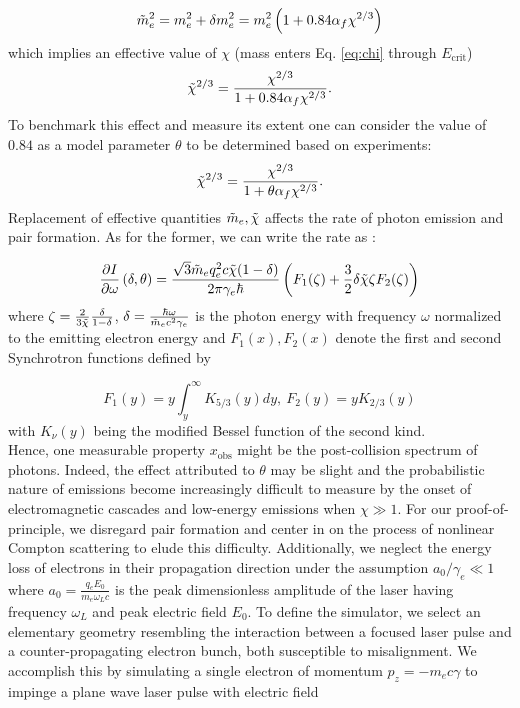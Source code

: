 \documentclass[%
 reprint,
 amsmath,amssymb,
 aps,
]{revtex4-2}
\begin{document}
\begin{equation} \label{eq:EffMass}
\Tilde{m}^2_e = m^2_e + \delta m^2_e = m^2_e \left(1 + 0.84 \alpha_f \chi^{2/3}\right)
\end{equation}
which implies an effective value of $\chi$ (mass enters Eq. \eqref{eq:chi} through $E_{\text{crit}}$)
\begin{equation}
\Tilde{\chi}^{2/3} = \frac{\chi^{2/3}}{1 + 0.84 \alpha_f \chi^{2/3}} .
\end{equation}
To benchmark this effect and measure its extent one can consider the value of $0.84$ as a model parameter $\theta$ to be determined based on experiments:
\begin{equation} \label{eq:EffChi}
\Tilde{\chi}^{2/3} = \frac{\chi^{2/3}}{1 + \theta \alpha_f \chi^{2/3}} .
\end{equation}
Replacement of effective quantities $\Tilde{m}_e, \Tilde{\chi}$ affects the rate of photon emission and pair formation. As for the former, we can write the rate as \cite{berestetskii1982quantum,baier1967quantum}:

\begin{equation} \label{eq:nonLinComptonRate}
\frac{\partial I}{\partial \omega} \left(\delta, \theta \right) = \frac{\sqrt{3} \Tilde{m}_e q_e^2 c \Tilde{\chi}(1-\delta)}{2 \pi \gamma_e \hbar} \left( F_1(\zeta) + \frac{3}{2} \delta \Tilde{\chi} \zeta F_2(\zeta) \right)
\end{equation}
where $\zeta = \frac{2}{3 \Tilde{\chi}} \frac{\delta}{1 - \delta}$, $\delta = \frac{\hbar \omega}{\Tilde{m}_e c^2 \gamma_e}$ is the photon energy with frequency $\omega$ normalized to the emitting electron energy and $F_{1}(x), F_2(x)$ denote the first and second Synchrotron functions defined by

\begin{equation} \label{eq:SynchrotronFunctions}
    F_1(y) = y \int_y^{\infty} K_{5/3}(y) dy, \ F_2(y) = y K_{2/3}(y)
\end{equation}
with $K_{\nu}(y)$ being the modified Bessel function of the second kind. \\ 

Hence, one measurable property $x_{\text{obs}}$ might be the post-collision spectrum of photons. Indeed, the effect attributed to $\theta$ may be slight and the probabilistic nature of emissions become increasingly difficult to measure by the onset of electromagnetic cascades and low-energy emissions when $\chi \gg 1$. For our proof-of-principle, we disregard pair formation and center in on the process of nonlinear Compton scattering to elude this difficulty. Additionally, we neglect the energy loss of electrons in their propagation direction under the assumption $a_0/\gamma_e \ll 1$ where $a_0 = \frac{q_e E_0}{m_e \omega_L c}$ is the peak dimensionless amplitude of the laser having frequency $\omega_L$ and peak electric field $E_0$. To define the simulator, we select an elementary geometry resembling the interaction between a focused laser pulse and a counter-propagating electron bunch, both susceptible to misalignment. We accomplish this by simulating a single electron of momentum $p_z = -m_e c \gamma$ to impinge a plane wave laser pulse with electric field
\end{document}

